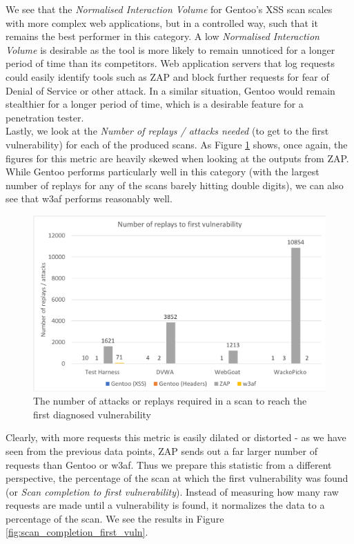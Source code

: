  We see that the \textit{Normalised Interaction Volume} for Gentoo's XSS scan scales with more complex web applications, but in a controlled way, such that it remains the best performer in this category. A low \textit{Normalised Interaction Volume} is desirable as the tool is more likely to remain unnoticed for a longer period of time than its competitors. Web application servers that log requests could easily identify tools such as ZAP and block further requests for fear of Denial of Service or other attack. In a similar situation, Gentoo would remain stealthier for a longer period of time, which is a desirable feature for a penetration tester. \\ 

Lastly, we look at the \textit{Number of replays / attacks needed} (to get to the first vulnerability) for each of the produced scans. As Figure \ref{fig:number_replays_first_vuln} shows, once again, the figures for this metric are heavily skewed when looking at the outputs from ZAP. While Gentoo performs particularly well in this category (with the largest number of replays for any of the scans barely hitting double digits), we can also see that w3af performs reasonably well. \\

\begin{figure}[h!]
	\centering
	\includegraphics[width=\textwidth]{images/evaluation/number_replays_first_vuln.png}
	\caption{The number of attacks or replays required in a scan to reach the first diagnosed vulnerability}
	\label{fig:number_replays_first_vuln}
\end{figure}


 Clearly, with more requests this metric is easily dilated or distorted - as we have seen from the previous data points, ZAP sends out a far larger number of requests than Gentoo or w3af. Thus we prepare this statistic from a different perspective, the percentage of the scan at which the first vulnerability was found (or \textit{Scan completion to first vulnerability}). Instead of measuring how many raw requests are made until a vulnerability is found, it normalizes the data to a percentage of the scan. We see the results in Figure \ref{fig:scan_completion_first_vuln}. \\
 
